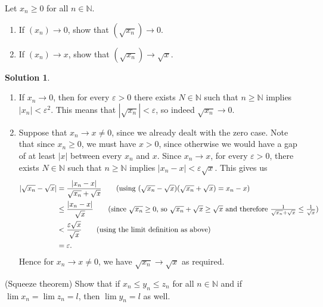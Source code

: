 \documentclass[12pt]{article}
\theoremstyle{definition}
\theoremstyle{definition}
\newtheorem*{soln}{Solution}
\newcommand{\N}{\mathbb{N}}
\begin{document}
\begin{prob}
Let $x_n\geq 0$ for all $n\in\N$.
\begin{enumerate}[label=(\alph*)]
\item If $(x_n)\to0$, show that $(\sqrt{x_n})\to 0$.

\item If $(x_n)\to x$, show that $(\sqrt{x_n})\to\sqrt{x}$.
\end{enumerate}
\end{prob}

\begin{soln}
\begin{enumerate}[label=(\alph*)]
\item If $x_n\to0$, then for every $\varepsilon>0$ there exists $N\in\N$ such that $n\geq\N$ implies $|x_n|<\varepsilon^2$. This means that $|\sqrt{x_n}|<\varepsilon$, so indeed $\sqrt{x_n}\to 0$.

\item Suppose that $x_n\to x\neq 0$, since we already dealt with the zero case. Note that since $x_n\geq 0$, we must have $x>0$, since otherwise we would have a gap of at least $|x|$ between every $x_n$ and $x$. Since $x_n\to x$, for every $\varepsilon>0$, there exists $N\in\N$ such that $n\geq\N$ implies $|x_n-x|<\varepsilon\sqrt{x}$. This gives us
\begin{align*}
|\sqrt{x_n}-\sqrt{x}| &= \frac{|x_n-x|}{\sqrt{x_n}+\sqrt{x}} \tag{using $(\sqrt{x_n}-\sqrt{x})(\sqrt{x_n}+\sqrt{x})=x_n-x$}\\
&\leq \frac{|x_n-x|}{\sqrt{x}} \tag{since $\sqrt{x_n}\geq 0$, so $\sqrt{x_n}+\sqrt{x}\geq \sqrt{x}$ and therefore $\frac{1}{\sqrt{x_n}+\sqrt{x}}\leq \frac{1}{\sqrt{x}}$}\\
&< \frac{\varepsilon\sqrt{x}}{\sqrt{x}} \tag{using the limit definition as above}\\
&= \varepsilon.
\end{align*}
Hence for $x_n\to x\neq 0$, we have $\sqrt{x_n}\to\sqrt{x}$ as required.
\end{enumerate}
\end{soln}

\begin{prob}
(Squeeze theorem) Show that if $x_n\leq y_n \leq z_n$ for all $n\in\N$ and if $\lim x_n=\lim z_n=l$, then $\lim y_n=l$ as well.
\end{prob}
\end{document}
